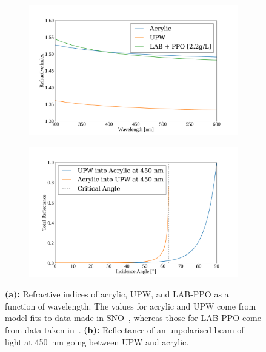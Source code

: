 \begin{figure}
    \centering
    \begin{subfigure}{0.48\textwidth}
        \centering
        \includegraphics[width=0.95\linewidth]{2_Detector/Figs/refractive_indices_plot.pdf}
        \caption{}
        \label{fig:ref_indices_snoplus}
    \end{subfigure}
    \begin{subfigure}{0.48\textwidth}
        \centering
        \includegraphics[width=0.95\linewidth]{2_Detector/Figs/reflectance_vs_angle_plot.pdf}
        \caption{}
        \label{fig:reflectance_vs_angle}
    \end{subfigure}
    \caption[Refractive indices of acrylic, UPW, and LAB-PPO as a function of wavelength; also reflectance as a function of incidence angle]
    {\textbf{(a):} Refractive indices of acrylic, UPW, and LAB-PPO as a function of wavelength. The values for acrylic and UPW come from model fits to data made in SNO~\cite{boardmanDetectionCherenkovRadiation1992,moffatOpticalCalibrationSudbury2001}, whereas those for LAB-PPO come from data taken in~\cite{tseungEllipsometricMeasurementsRefractive2011}. \textbf{(b):} Reflectance of an unpolarised beam of light at \SI{450}{\nm} going between UPW and acrylic.
    }
    \label{fig:ref_index_and_reflectance}
\end{figure}

